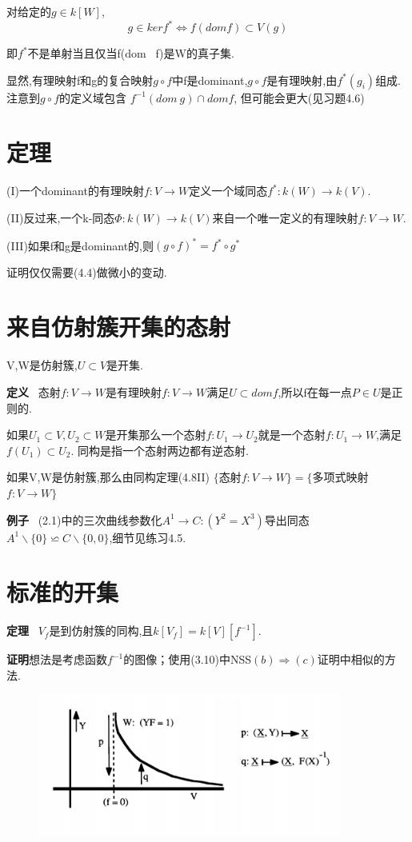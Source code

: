 \documentclass[UTF8]{book}
\begin{document}
		\justifying
		对给定的$g\in k[W]$,
		\begin{equation*}
		g\in ker f^{*} \iff f(dom f)\subset V(g)
		\end{equation*}

		即$f^{*}$不是单射当且仅当f(dom \ f)是W的真子集.

		显然,有理映射f和g的复合映射$g\circ f$中f是dominant,$g\circ f$是有理映射,由$f^{*}(g_{i})$组成.注意到$g\circ f$的定义域包含 $f^{-1}(dom \ g)\cap dom f$, 但可能会更大(见习题4.6)
	\section{定理}
		(I)一个dominant的有理映射$f:V\rightarrow W$定义一个域同态$f^{*}:k(W)\rightarrow k(V)$.

		(II)反过来,一个k-同态$\Phi: k(W)\rightarrow k(V)$来自一个唯一定义的有理映射$f:V\rightarrow W$.

		(III)如果f和g是dominant的,则$(g\circ f)^{*}=f^{*}\circ g^{*}$

		证明仅仅需要(4.4)做微小的变动.

	\section{来自仿射簇开集的态射}
		V,W是仿射簇,$U\subset V$是开集.

		\textbf{定义} \ 态射$f:V\rightarrow W$是有理映射$f:V\rightarrow W$满足$U\subset dom f$,所以f在每一点$P\in U$是正则的.

		如果$U_{1}\subset V,U_{2}\subset W$是开集那么一个态射$f:U_{1}\rightarrow U_{2}$就是一个态射$f:U_{1}\rightarrow W$,满足$f(U_{1})\subset U_{2}$. 同构是指一个态射两边都有逆态射.

		如果V,W是仿射簇,那么由同构定理(4.8II)
		\center  $\{$态射$f:V\rightarrow W\}=\{$多项式映射$f:V\rightarrow W\}$


		\justifying
		\textbf{例子} \ (2.1)中的三次曲线参数化$A^{1} \rightarrow C:(Y^{2}=X^{3}) $导出同态$A^{1}\backslash \{0\}\backsimeq C\backslash \{0,0\}$,细节见练习4.5.


	\section{标准的开集}


		\textbf{定理} \ $V_{f}$是到仿射簇的同构,且$k[V_{f}]=k[V][f^{-1}].$

		\textbf{证明}想法是考虑函数$f^{-1}$的图像；使用(3.10)中NSS$(b)\Rightarrow(c)$证明中相似的方法.
		\begin{figure}[h]
		  \centering
		  \includegraphics[width=10cm]{75.jpg}\\
		\end{figure}
\end{document}
